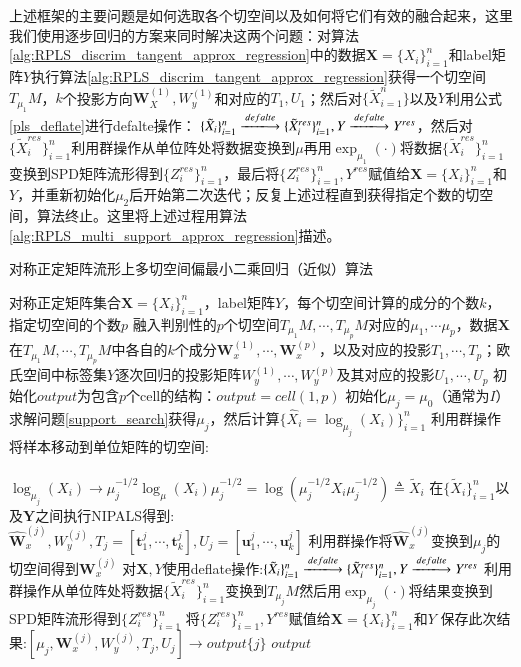 上述框架的主要问题是如何选取各个切空间以及如何将它们有效的融合起来，这里我们使用逐步回归的方案来同时解决这两个问题：对算法\ref{alg:RPLS_discrim_tangent_approx_regression}中的数据$\bm{X}=\{X_i\}_{i=1}^{n}$和label矩阵${Y}$执行算法\ref{alg:RPLS_discrim_tangent_approx_regression}获得一个切空间$T_{\mu_1}M$，$k$个投影方向$\bm{W}_{X}^{(1)},W_{y}^{(1)}$和对应的$T_{1},U_{1}$；然后对$\{\tilde{X}_{i=1}^{n}\}$以及$Y$利用公式\ref{pls_deflate}进行defalte操作：%
$\{\tilde{X}_{i}\}_{i=1}^{n} \xlongrightarrow{defalte} \{\tilde{X}^{res}_i\}_{i=1}^{n},{Y}\xlongrightarrow{defalte} {Y}^{res}$，然后对$\{\tilde{X}^{res}_{i}\}_{i=1}^{n}$利用群操作从单位阵处将数据变换到$\mu$再用$\exp_{\mu_{1}}(\cdot)$将数据$\{\tilde{X}^{res}_i\}_{i=1}^{n}$变换到SPD矩阵流形得到$\{Z^{res}_{i}\}_{i=1}^{n}$，最后将$\{Z^{res}_i\}_{i=1}^{n},{Y}^{res}$赋值给$\bm{X}=\{X_i\}_{i=1}^{n}$和$Y$，并重新初始化$\mu_2$后开始第二次迭代；反复上述过程直到获得指定个数的切空间，算法终止。这里将上述过程用算法\ref{alg:RPLS_multi_support_approx_regression}描述。
\begin{algorithm}[htb]
\caption{对称正定矩阵流形上多切空间偏最小二乘回归（近似）算法}
\label{alg:RPLS_multi_support_approx_regression}
\begin{algorithmic}[1]
\REQUIRE 对称正定矩阵集合$\bm{X}=\{X_i\}_{i=1}^{n}$，label矩阵${Y}$，每个切空间计算的成分的个数$k$，指定切空间的个数$p$
\ENSURE 融入判别性的$p$个切空间$T_{\mu_1}M,\cdots,T_{\mu_{p}}M$对应的$\mu_{1},\cdots \mu_{p}$，数据$\bm{X}$在$T_{\mu_1}M,\cdots,T_{\mu_{p}}M$中各自的$k$个成分$\bm{W}_{x}^{(1)},\cdots,\bm{W}_{x}^{(p)}$，以及对应的投影$T_1,\cdots,T_{p}$；欧氏空间中标签集${Y}$逐次回归的投影矩阵$W_{y}^{(1)},\cdots,W_{y}^{(p)}$及其对应的投影$U_1,\cdots,U_{p}$
\STATE 初始化$output$为包含$p$个cell的结构：$output=cell(1,p)$
	\STATE 初始化$\mu_j=\mu_0$（通常为$I$）求解问题\ref{support_search}获得$\mu_j$，然后计算$\{\hat{X}_i=\log_{\mu_j}(X_i)\}_{i=1}^{n}$
	\STATE 利用群操作将样本移动到单位矩阵的切空间:\\
 	~~~~~~~~~~~~~~~~~~~~$\log_{\mu_{j}}(X_i)\rightarrow \mu_{j}^{-1/2}\log_{\mu}(X_i)\mu_{j}^{-1/2}=\log(\mu_{j}^{-1/2}X_i\mu_{j}^{-1/2})\triangleq \tilde{X}_i$
	\STATE 在$\{\tilde{X}_{i}\}_{i=1}^{n}$以及$\bm{Y}$之间执行NIPALS\cite{pls_NIPALS}得到:\\
	$\hat{\bm{W}}_{x}^{(j)},W_{y}^{(j)},T_{j}=[\bm{t}_{1}^{j},\cdots,\bm{t}_{k}^{j}],U_j=[\bm{u}_{1}^{j},\cdots,\bm{u}_{k}^{j}]$
	\STATE 利用群操作将$\hat{\bm{W}}_{x}^{(j)}$变换到$\mu_{j}$的切空间得到$\bm{W}_{x}^{(j)}$
	\STATE 对$\bm{X},{Y}$使用deflate操作:$\{\tilde{X}_{i}\}_{i=1}^{n} \xlongrightarrow{defalte} \{\tilde{X}^{res}_{i}\}_{i=1}^{n},{Y}\xlongrightarrow{defalte} {Y}^{res}$
	\STATE 利用群操作从单位阵处将数据$\{\tilde{X}^{res}_{i}\}_{i=1}^{n}$变换到$T_{\mu_{j}}M$然后用$\exp_{\mu_{j}}(\cdot)$将结果变换到SPD矩阵流形得到$\{Z^{res}_{i}\}_{i=1}^{n}$
	\STATE 将$\{Z^{res}_{i}\}_{i=1}^{n},{Y^{res}}$赋值给$\bm{X}=\{X_i\}_{i=1}^{n}$和${Y}$
	\STATE 保存此次结果:$[\mu_{j},\bm{W}_{x}^{(j)},W_{y}^{(j)},T_{j},U_{j}]\rightarrow output\{j\}$
\ENDFOR
\RETURN $output$
\end{algorithmic}
\end{algorithm}

